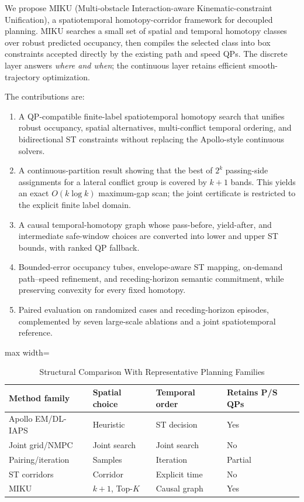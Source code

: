 We propose MIKU (Multi-obstacle Interaction-aware Kinematic-constraint Unification), a spatiotemporal homotopy-corridor framework for decoupled planning. MIKU searches a small set of spatial and temporal homotopy classes over robust predicted occupancy, then compiles the selected class into box constraints accepted directly by the existing path and speed QPs. The discrete layer answers \emph{where and when}; the continuous layer retains efficient smooth-trajectory optimization.

The contributions are:
\begin{enumerate}
  \item A QP-compatible finite-label spatiotemporal homotopy search that unifies robust occupancy, spatial alternatives, multi-conflict temporal ordering, and bidirectional ST constraints without replacing the Apollo-style continuous solvers.
  \item A continuous-partition result showing that the best of $2^k$ passing-side assignments for a lateral conflict group is covered by $k+1$ bands. This yields an exact $O(k\log k)$ maximum-gap scan; the joint certificate is restricted to the explicit finite label domain.
  \item A causal temporal-homotopy graph whose pass-before, yield-after, and intermediate safe-window choices are converted into lower and upper ST bounds, with ranked QP fallback.
  \item Bounded-error occupancy tubes, envelope-aware ST mapping, on-demand path--speed refinement, and receding-horizon semantic commitment, while preserving convexity for every fixed homotopy.
  \item Paired evaluation on \RandCaseCount{} randomized cases and \ClosedCaseCount{} receding-horizon episodes, complemented by seven large-scale ablations and a joint spatiotemporal reference.
\end{enumerate}

\begin{table}[t]
\caption{Structural Comparison With Representative Planning Families}
\label{tab:related}
\centering
\scriptsize
\begin{adjustbox}{max width=\columnwidth}
\begin{tabular}{llll}
\toprule
Method family & Spatial choice & Temporal order & Retains P/S QPs\\
\midrule
Apollo EM/DL-IAPS \cite{fan2018baidu,zhou2021dliaps} & Heuristic & ST decision & Yes\\
Joint grid/NMPC \cite{hu2023_hybrid_astar_slt,guo2024joint} & Joint search & Joint search & No\\
Pairing/iteration \cite{cheng2022gp,zhang2023_dp_rcg} & Samples & Iteration & Partial\\
ST corridors \cite{yoon2024stcorridor,frenetcorridor2025} & Corridor & Explicit time & No\\
MIKU & $k+1$, Top-$K$ & Causal graph & Yes\\
\bottomrule
\end{tabular}
\end{adjustbox}
\end{table}

